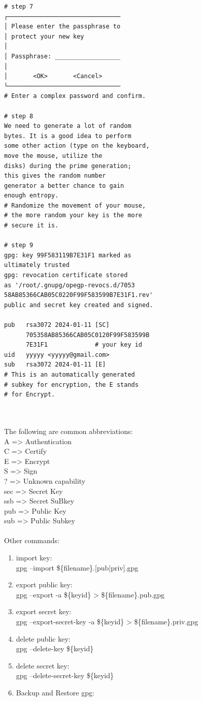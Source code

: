 \begin{lstlisting}
# step 7
┌───────────────────────────────
│ Please enter the passphrase to 
│ protect your new key           
│                                
│ Passphrase: __________________
│                                
│       <OK>       <Cancel>     
└───────────────────────────────
# Enter a complex password and confirm.

# step 8
We need to generate a lot of random 
bytes. It is a good idea to perform
some other action (type on the keyboard,
move the mouse, utilize the
disks) during the prime generation; 
this gives the random number
generator a better chance to gain 
enough entropy.
# Randomize the movement of your mouse, 
# the more random your key is the more 
# secure it is.

# step 9              
gpg: key 99F583119B7E31F1 marked as 
ultimately trusted
gpg: revocation certificate stored 
as '/root/.gnupg/opegp-revocs.d/7053
58AB85366CAB05C0220F99F583599B7E31F1.rev'
public and secret key created and signed.

pub   rsa3072 2024-01-11 [SC]
      705358AB85366CAB05C0120F99F583599B
      7E31F1			 # your key id
uid   yyyyy <yyyyy@gmail.com>
sub   rsa3072 2024-01-11 [E]
# This is an automatically generated 
# subkey for encryption, the E stands
# for Encrypt.

\end{lstlisting}
\\
\\
The following are common abbreviations:\cite{b40, b41}
\\
A    =>    Authentication
\\
C    =>    Certify
\\
E    =>    Encrypt
\\
S    =>    Sign
\\
?    =>    Unknown capability
\\
sec  =>    Secret Key
\\
ssb  =>    Secret SuBkey
\\
pub  =>    Public Key
\\
sub  =>    Public Subkey
\\
\\
Other commands:\cite{b40, b41}
\begin{enumerate}[]
    \item import key: \\gpg --import \$\{filename\}.[pub|priv].gpg
    \item export public key: \\gpg --export -a \$\{keyid\} > \$\{filename\}.pub.gpg
    \item export secret key: \\gpg --export-secret-key -a \$\{keyid\} > \$\{filename\}.priv.gpg
    \item delete public key: \\gpg --delete-key \$\{keyid\}
    \item delete secret key: \\gpg --delete-secret-key \$\{keyid\}
    \item Backup and Restore gpg:
\end{enumerate}
